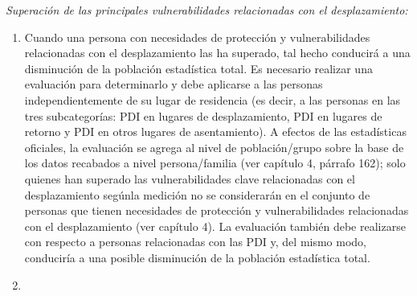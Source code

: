 \documentclass[
]{book}
\begin{document}
\emph{Superación de las principales vulnerabilidades relacionadas con el desplazamiento:}

\begin{enumerate}
\def\labelenumi{\arabic{enumi}.}
\item
  Cuando una persona con necesidades de protección y vulnerabilidades relacionadas con el desplazamiento las ha superado, tal hecho conducirá a una disminución de la población estadística total. Es necesario realizar una evaluación para determinarlo y debe aplicarse a las personas independientemente de su lugar de residencia (es decir, a las personas en las tres subcategorías: PDI en lugares de desplazamiento, PDI en lugares de retorno y PDI en otros lugares de asentamiento). A efectos de las estadísticas oficiales, la evaluación se agrega al nivel de población/grupo sobre la base de los datos recabados a nivel persona/familia (ver capítulo 4, párrafo 162); solo quienes han superado las vulnerabilidades clave relacionadas con el desplazamiento segúnla medición no se considerarán en el conjunto de personas que tienen necesidades de protección y vulnerabilidades relacionadas con el desplazamiento (ver capítulo 4). La evaluación también debe realizarse con respecto a personas relacionadas con las PDI y, del mismo modo, conduciría a una posible disminución de la población estadística total.
\item ~
  \hypertarget{cuxf3mo-determinar-el-aumento-cuatro-condiciones}{%
}
\end{enumerate}
\end{document}
